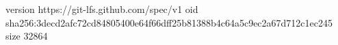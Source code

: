 version https://git-lfs.github.com/spec/v1
oid sha256:3decd2afc72cd84805400e64f66dff25b81388b4c64a5c9ec2a67d712c1ec245
size 32864
